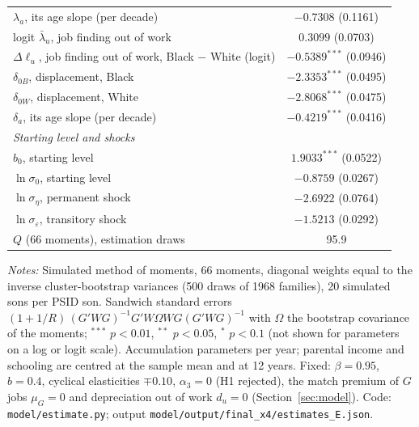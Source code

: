 \begin{table}[!htbp]
{\begin{tabular}{lc}
\quad $\lambda_a$, its age slope (per decade) & $-0.7308$ (0.1161) \\
\quad logit $\bar\lambda_u$, job finding out of work & $0.3099$ (0.0703) \\
\quad $\Delta\ell_u$, job finding out of work, Black $-$ White (logit) & $-0.5389^{***}$ (0.0946) \\
\quad $\delta_{0B}$, displacement, Black & $-2.3353^{***}$ (0.0495) \\
\quad $\delta_{0W}$, displacement, White & $-2.8068^{***}$ (0.0475) \\
\quad $\delta_a$, its age slope (per decade) & $-0.4219^{***}$ (0.0416) \\
\multicolumn{2}{l}{\textit{Starting level and shocks}} \\
\quad $b_0$, starting level & $1.9033^{***}$ (0.0522) \\
\quad $\ln\sigma_0$, starting level & $-0.8759$ (0.0267) \\
\quad $\ln\sigma_\eta$, permanent shock & $-2.6922$ (0.0764) \\
\quad $\ln\sigma_\varepsilon$, transitory shock & $-1.5213$ (0.0292) \\
\midrule
$Q$ (66 moments), estimation draws & 95.9 \\
\bottomrule
\end{tabular}}
\par\smallskip
\begin{minipage}{\textwidth}\footnotesize \textit{Notes:} Simulated method of moments, 66 moments, diagonal weights equal to the inverse cluster-bootstrap variances (500 draws of 1968 families), 20 simulated sons per PSID son. Sandwich standard errors $(1 + 1/R)\,(G'WG)^{-1}G'W\Omega WG(G'WG)^{-1}$ with $\Omega$ the bootstrap covariance of the moments; $^{***}$ $p<0.01$, $^{**}$ $p<0.05$, $^{*}$ $p<0.1$ (not shown for parameters on a log or logit scale). Accumulation parameters per year; parental income and schooling are centred at the sample mean and at 12 years. Fixed: $\beta = 0.95$, $b = 0.4$, cyclical elasticities $\mp 0.10$, $\alpha_3 = 0$ (H1 rejected), the match premium of $G$ jobs $\mu_G = 0$ and depreciation out of work $d_u = 0$ (Section~\ref{sec:model}). Code: \texttt{model/estimate.py}; output \texttt{model/output/final\_x4/estimates\_E.json}.\end{minipage}
\end{table}
